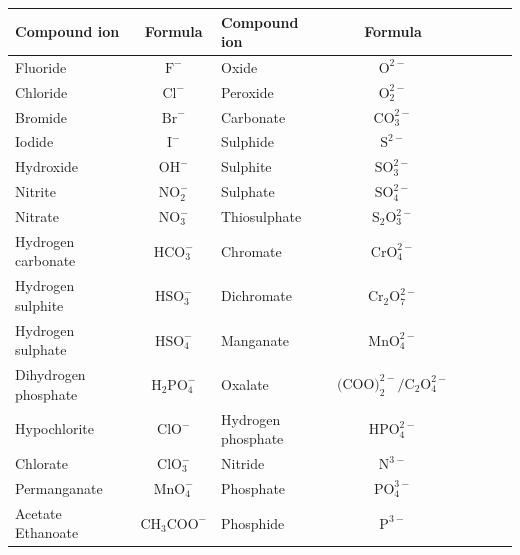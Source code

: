 \begin{enumerate}[noitemsep, label=\textbf{\arabic*}. ]
\begin{table}[H]
\begin{center}
\label{tab:anions}
\begin{tabular}{|l|c|l|c|l|c|l|c|} \hline
\textbf{Compound ion} & \textbf{Formula}            & \textbf{Compound ion} & \textbf{Formula} \\ \hline
Fluoride             & $\text{F}^{-}$             & Oxide              & $\text{O}^{2-}$ \\ \hline
Chloride             & $\text{Cl}^{-}$            & Peroxide           & $\text{O}_{2}^{2-}$ \\ \hline
Bromide              & $\text{Br}^{-}$            & Carbonate          & $\text{CO}_{3}^{2-}$ \\ \hline
Iodide               & $\text{I}^{-}$             & Sulphide           & $\text{S}^{2-}$ \\ \hline
Hydroxide            & $\text{OH}^{-}$            & Sulphite           & $\text{SO}_{3}^{2-}$ \\ \hline
Nitrite              & $\text{NO}_{2}^{-}$        & Sulphate           & $\text{SO}_{4}^{2-}$ \\ \hline
Nitrate              & $\text{NO}_{3}^{-}$        & Thiosulphate       & $\text{S}_{2}{\text{O}}_{3}^{2-}$ \\ \hline
Hydrogen carbonate   & $\text{HCO}_{3}^{-}$       & Chromate           & $\text{CrO}_{4}^{2-}$ \\ \hline
Hydrogen sulphite    & $\text{HSO}_{3}^{-}$       & Dichromate         & $\text{Cr}_{2}{\text{O}}_{7}^{2-}$ \\ \hline
Hydrogen sulphate    & $\text{HSO}_{4}^{-}$       & Manganate          & $\text{MnO}_{4}^{2-}$ \\ \hline
Dihydrogen phosphate & $\text{H}_{2}{\text{PO}}_{4}^{-}$ & Oxalate   & $\text{(COO)}_{2}^{2-}/{\text{C}}_{2}{\text{O}}_{4}^{2-}$ \\ \hline
Hypochlorite         & $\text{ClO}^{-}$           & Hydrogen phosphate & $\text{HPO}_{4}^{2-}$ \\ \hline
Chlorate             & $\text{ClO}_{3}^{-}$       & Nitride            & $\text{N}^{3-}$ \\ \hline
Permanganate         & $\text{MnO}_{4}^{-}$       & Phosphate          & $\text{PO}_{4}^{3-}$ \\ \hline
Acetate Ethanoate    & $\text{CH}_{3}{\text{COO}}^{-}$   & Phosphide          & $\text{P}^{3-}$ \\ \hline
\end{tabular}


\end{center}
\end{table}
\end{enumerate}
